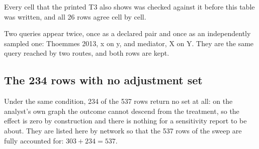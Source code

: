 Every cell that the printed T3 also shows was checked against it before this table was written, and
all 26 rows agree cell by cell.

Two queries appear twice, once as a declared pair and once as an independently sampled one:
Thoemmes 2013, x on y, and mediator, X on Y. They are the same query reached by two routes, and both
rows are kept.



\clearpage
\subsection{The 234 rows with no adjustment set}

Under the same condition, 234 of the 537 rows return no set at all: on the analyst's own graph the
outcome cannot descend from the treatment, so the effect is zero by construction and there is nothing
for a sensitivity report to be about. They are listed here by network so that the 537 rows of the
sweep are fully accounted for: $303 + 234 = 537$.


